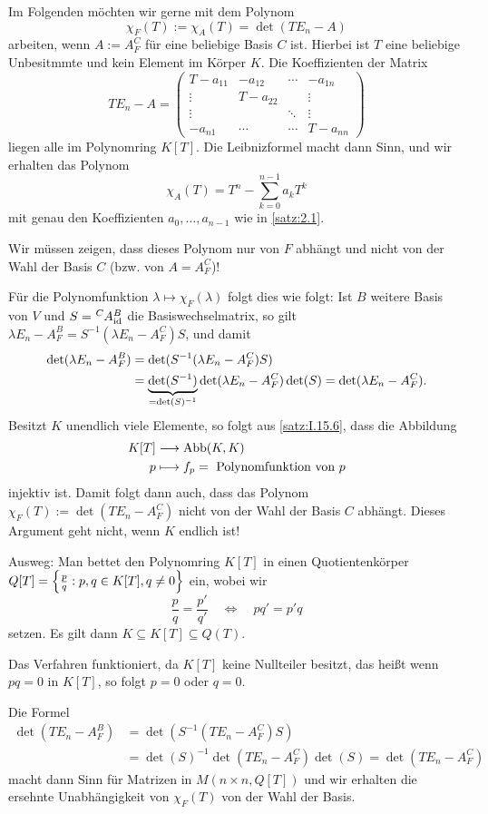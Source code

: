 \begin{problem}
	\label{prob:2.2}
	Im Folgenden möchten wir gerne mit dem Polynom
	\[
		\chi_F(T) := \chi_A(T) = \det(TE_n - A)
	\]
	arbeiten, wenn $A := A_F^C$ für eine beliebige Basis $C$ ist.
	Hierbei ist $T$ eine beliebige Unbesitmmte und kein Element im Körper $K$.
	Die Koeffizienten der Matrix
	\[
		TE_n-A = \begin{pmatrix}
		T-a_{11} & -a_{12} & \cdots & -a_{1n} \\ 
		\vdots & T-a_{22} &  & \vdots \\ 
		\vdots &  & \ddots & \vdots \\ 
		-a_{n1} & \cdots & \cdots & T-a_{nn}
		\end{pmatrix} 
	\]
	liegen alle im Polynomring $K[T]$.
	Die Leibnizformel macht dann Sinn, und wir erhalten das Polynom
	\[
		\chi_A(T) = T^n - \sum_{k=0}^{n-1} a_kT^k
	\]
	mit genau den Koeffizienten $a_0,\dots,a_{n-1}$ wie in \autoref{satz:2.1}.
	
	Wir müssen zeigen, dass dieses Polynom nur von $F$ abhängt und nicht von der Wahl der Basis $C$ (bzw. von $A = A_F^C$)!
	
	Für die Polynomfunktion $\lambda \mapsto \chi_F(\lambda)$ folgt dies wie folgt:
	Ist $B$ weitere Basis von $V$ und $S = \mat{A}{C}{B}{\id}$ die Basiswechselmatrix, so gilt $\lambda E_n - A_F^B = S^{-1}(\lambda E_n - A_F^C)S$, und damit
	\begin{align*}
		\det(\lambda E_n - A_F^B) &= \det(S^{-1}(\lambda E_n-A_F^C)S) \\
		&= {\underbrace{\det(S^{-1})}_{=\det(S)^{-1}}} \det(\lambda E_n - A_F^C) \det(S) = \det(\lambda E_n -A_F^C).
	\end{align*}
	\newpage
	Besitzt $K$ unendlich viele Elemente, so folgt aus \autoref{satz:I.15.6}, dass die Abbildung
	\begin{align*}
		K[T] &\longrightarrow \operatorname{Abb}(K,K) \\
		p &\longmapsto f_p = \text{ Polynomfunktion von } p
	\end{align*}
	injektiv ist.
	Damit folgt dann auch, dass das Polynom $\chi_F(T) := \det(TE_n - A_F^C)$ nicht von der Wahl der Basis $C$ abhängt.
	Dieses Argument geht nicht, wenn $K$ endlich ist!

	Ausweg: Man bettet den Polynomring $K[T]$ in einen Quotientenkörper $Q[T] = \left\{\frac{p}{q} : p,q \in K[T], q \neq 0\right\}$ ein, wobei wir
	\[
		\frac{p}{q} = \frac{p'}{q'} \quad \Leftrightarrow \quad pq' = p'q
	\]
	setzen.
	Es gilt dann $K \subseteq K[T] \subseteq Q(T)$.
	
	Das Verfahren funktioniert, da $K[T]$ keine Nullteiler besitzt, das heißt wenn $pq = 0$ in $K[T]$, so folgt $p = 0$ oder $q=0$.
	
	Die Formel
	\begin{align*}
		\det(TE_n - A_F^B) &= \det(S^{-1}(TE_n - A_F^C)S) \\
		&= \det(S)^{-1} \det(TE_n - A_F^C) \det(S) = \det(TE_n - A_F^C)
	\end{align*}
	macht dann Sinn für Matrizen in $M(n \times n,Q[T])$ und wir erhalten die ersehnte Unabhängigkeit von $\chi_F(T)$ von der Wahl der Basis.
\end{problem}

